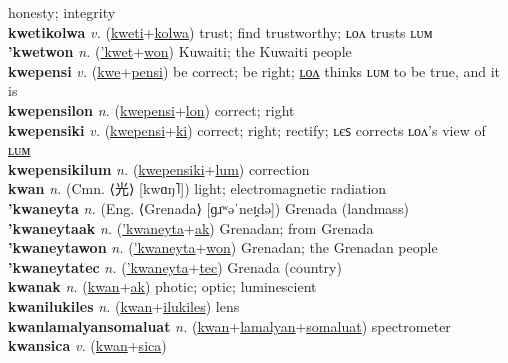 honesty; integrity \label{kwetilyan} \\
\textbf{kwetikolwa} \textit{v.} (\hyperref[kweti]{kweti}+\hyperref[kolwa]{kolwa})
trust; find trustworthy; ʟᴏᴧ trusts ʟᴜᴍ \label{kwetikolwa} \\
\textbf{'kwetwon} \textit{n.} (\hyperref['kwet]{'kwet}+\hyperref[won]{won})
Kuwaiti; the Kuwaiti people \label{'kwetwon} \\
\textbf{kwepensi} \textit{v.} (\hyperref[kwe]{kwe}+\hyperref[pensi]{pensi})
be correct; be right; \hyperref[kwepensilon]{ʟᴏᴧ} thinks ʟᴜᴍ to be true, and it is \label{kwepensi} \\
\textbf{kwepensilon} \textit{n.} (\hyperref[kwepensi]{kwepensi}+\hyperref[lon]{lon})
correct; right \label{kwepensilon} \\
\textbf{kwepensiki} \textit{v.} (\hyperref[kwepensi]{kwepensi}+\hyperref[ki]{ki})
correct; right; rectify; ʟєꜱ corrects ʟᴏᴧ's view of \hyperref[kwepensikilum]{ʟᴜᴍ} \label{kwepensiki} \\
\textbf{kwepensikilum} \textit{n.} (\hyperref[kwepensiki]{kwepensiki}+\hyperref[lum]{lum})
correction \label{kwepensikilum} \\
\textbf{kwan} \textit{n.} (Cmn. ⟨光⟩ [kwɑŋ˥])
light; electromagnetic radiation \label{kwan} \\
\textbf{'kwaneyta} \textit{n.} (Eng. ⟨Grenada⟩ [ɡɹʷəˈneɪ̯də])
Grenada (landmass) \label{'kwaneyta} \\
\textbf{'kwaneytaak} \textit{n.} (\hyperref['kwaneyta]{'kwaneyta}+\hyperref[ak]{ak})
Grenadan; from Grenada \label{'kwaneytaak} \\
\textbf{'kwaneytawon} \textit{n.} (\hyperref['kwaneyta]{'kwaneyta}+\hyperref[won]{won})
Grenadan; the Grenadan people \label{'kwaneytawon} \\
\textbf{'kwaneytatec} \textit{n.} (\hyperref['kwaneyta]{'kwaneyta}+\hyperref[tec]{tec})
Grenada (country) \label{'kwaneytatec} \\
\textbf{kwanak} \textit{n.} (\hyperref[kwan]{kwan}+\hyperref[ak]{ak})
photic; optic; luminescient \label{kwanak} \\
\textbf{kwanilukiles} \textit{n.} (\hyperref[kwan]{kwan}+\hyperref[ilukiles]{ilukiles})
lens \label{kwanilukiles} \\
\textbf{kwanlamalyansomaluat} \textit{n.} (\hyperref[kwan]{kwan}+\hyperref[lamalyan]{lamalyan}+\hyperref[somaluat]{somaluat})
spectrometer \label{kwanlamalyansomaluat} \\
\textbf{kwansica} \textit{v.} (\hyperref[kwan]{kwan}+\hyperref[sica]{sica})
